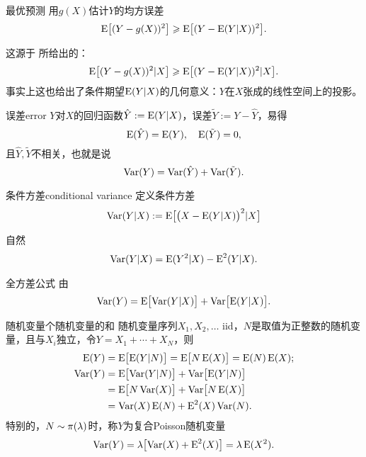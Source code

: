 \begin{theorem}{最优预测}{}
	用$g(X)$估计$Y$的均方误差
	\begin{align}
		\E\bigfkh{(Y-g(X))^2}\geqslant\E\bigfkh{(Y-\E(Y|X))^2}.
	\end{align}
\end{theorem}
这源于 所给出的：
\[
	\E\bigfkh{(Y-g(X))^2|X}\geqslant\E\bigfkh{(Y-\E(Y|X))^2|X}.
\]
事实上这也给出了条件期望$\E(Y|X)$的几何意义：$Y$在$X$张成的线性空间上的投影。
\begin{example}{误差}{error}
	$Y$对$X$的回归函数$\hat Y:=\E(Y|X)$，误差$\tilde Y:=Y-\hat Y$，易得
	\[
		\E(\hat Y)=\E(Y),\quad\E(\tilde Y)=0,
	\]
	且$\hat Y,\tilde Y$不相关，也就是说
	\[
		\Var(Y)=\Var(\hat Y)+\Var(\tilde Y).
	\]
	\begin{center}
	\end{center}
\end{example}
\begin{definition}{条件方差}{conditional variance}
	定义条件方差
	\begin{align}
		\Var(Y|X):=\E\bigfkh{\bigkh{X-\E(Y|X)}^2|X}
	\end{align}
\end{definition}
自然
\begin{align}
	\Var(Y|X)=\E(Y^2|X)-\E^2(Y|X).
\end{align}
\begin{theorem}{全方差公式}{}
	由
	\begin{align}
		\Var(Y)=\E\bigfkh{\Var(Y|X)}+\Var\bigfkh{\E(Y|X)}.
	\end{align}
\end{theorem}
\begin{example}{随机变量个随机变量的和}{}
	随机变量序列$X_1,X_2,\ldots$ iid，$N$是取值为正整数的随机变量，且与$X_i$独立，令$Y=X_1+\cdots+X_N$，则
	\begin{align}
		\E(Y)&=\E\bigfkh{\E(Y|N)}=\E\bigfkh{N\E(X)}=\E(N)\E(X);\\\notag
		\Var(Y)&=\E\bigfkh{\Var(Y|N)}+\Var\bigfkh{\E(Y|N)}\\\notag
		&=\E\bigfkh{N\Var(X)}+\Var\bigfkh{N\E(X)}\\
		&=\Var(X)\E(N)+\E^2(X)\Var(N).
	\end{align}
	特别的，$N\sim\Pois(\lambda)$时，称$Y$为复合Poisson随机变量
	\[
		\Var(Y)=\lambda\bigfkh{\Var(X)+\E^2(X)}=\lambda\E(X^2).
	\]
\end{example}